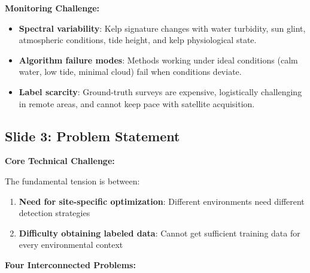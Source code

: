 \documentclass[11pt]{article}
\begin{document}
\textbf{Monitoring Challenge:}
\begin{itemize}
    \item \textbf{Spectral variability}: Kelp signature changes with water turbidity, sun glint, atmospheric conditions, tide height, and kelp physiological state.
    \item \textbf{Algorithm failure modes}: Methods working under ideal conditions (calm water, low tide, minimal cloud) fail when conditions deviate.
    \item \textbf{Label scarcity}: Ground-truth surveys are expensive, logistically challenging in remote areas, and cannot keep pace with satellite acquisition.
\end{itemize}

\subsection{Slide 3: Problem Statement}

\textbf{Core Technical Challenge:}

The fundamental tension is between:
\begin{enumerate}
    \item \textbf{Need for site-specific optimization}: Different environments need different detection strategies
    \item \textbf{Difficulty obtaining labeled data}: Cannot get sufficient training data for every environmental context
\end{enumerate}

\textbf{Four Interconnected Problems:}
\end{document}
